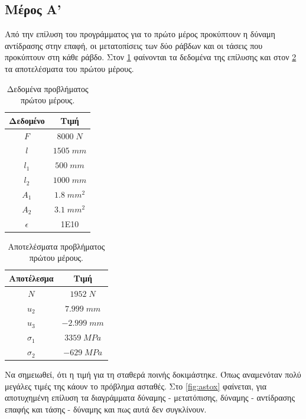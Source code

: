 \documentclass{article}
\begin{document}
\subsection{Μέρος Α'}
Από την επίλυση του προγράμματος για το πρώτο μέρος προκύπτουν η δύναμη αντίδρασης στην επαφή, οι μετατοπίσεις των δύο ράβδων και οι τάσεις που προκύπτουν στη κάθε ράβδο. Στον \ref{tab:ded} φαίνονται τα δεδομένα της επίλυσης και στον \ref{tab:apot} τα αποτελέσματα του πρώτου μέρους.
\begin{table}[H]
    \centering
    \begin{tabular}{|c|c|}
        \hline
        \rowcolor{Dandelion}
        Δεδομένο & Τιμή\\ \hline
        $F$ & $8000\; N$\\ \hline
        $l$ & $1505\; mm$\\ \hline
        $l_1$ & $500\; mm$\\ \hline
        $l_2$ & $1000\; mm$\\ \hline
        $A_1$ & $1.8\; mm^2$\\ \hline
        $A_2$ & $3.1\; mm^2$\\ \hline
        $\epsilon$ & 1E10 \\ \hline
    \end{tabular}
    \caption{Δεδομένα προβλήματος πρώτου μέρους.}
    \label{tab:ded}
\end{table}

\begin{table}[H]
    \centering
    \begin{tabular}{|c|c|}
        \hline
        \rowcolor{yellow}
        Αποτέλεσμα & Τιμή\\ \hline
        $N$ & $1952\; N$\\ \hline
        $u_2$ & $7.999\; mm$\\ \hline
        $u_3$ & $-2.999\; mm$\\ \hline
        $\sigma_1$ & $3359\; MPa$\\ \hline
        $\sigma_2$ & $-629\; MPa$\\ \hline
    \end{tabular}
    \caption{Αποτελέσματα προβλήματος πρώτου μέρους.}
    \label{tab:apot}
\end{table}

Να σημειωθεί, ότι η τιμή για τη σταθερά ποινής δοκιμάστηκε. Όπως αναμενόταν πολύ μεγάλες τιμές της κάουν το πρόβλημα ασταθές. Στο \ref{fig:astox} φαίνεται, για αποτυχημένη επίλυση τα διαγράμματα δύναμης - μετατόπισης, δύναμης - αντίδρασης επαφής και τάσης - δύναμης και πως αυτά δεν συγκλίνουν.
\end{document}
